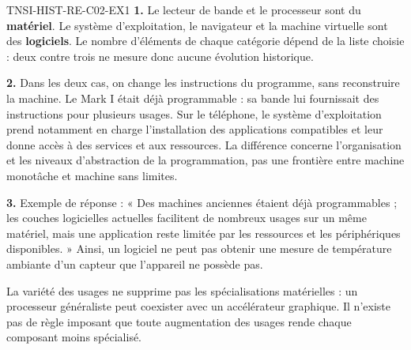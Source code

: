 \begin{corrige}{TNSI-HIST-RE-C02-EX1}
\textbf{1.} Le lecteur de bande et le processeur sont du \textbf{matériel}. Le système d'exploitation, le navigateur et la machine virtuelle sont des \textbf{logiciels}. Le nombre d'éléments de chaque catégorie dépend de la liste choisie : deux contre trois ne mesure donc aucune évolution historique.

\textbf{2.} Dans les deux cas, on change les instructions du programme, sans reconstruire la machine. Le Mark I était déjà programmable : sa bande lui fournissait des instructions pour plusieurs usages. Sur le téléphone, le système d'exploitation prend notamment en charge l'installation des applications compatibles et leur donne accès à des services et aux ressources. La différence concerne l'organisation et les niveaux d'abstraction de la programmation, pas une frontière entre machine monotâche et machine sans limites.

\textbf{3.} Exemple de réponse : « Des machines anciennes étaient déjà programmables ; les couches logicielles actuelles facilitent de nombreux usages sur un même matériel, mais une application reste limitée par les ressources et les périphériques disponibles. » Ainsi, un logiciel ne peut pas obtenir une mesure de température ambiante d'un capteur que l'appareil ne possède pas.

La variété des usages ne supprime pas les spécialisations matérielles : un processeur généraliste peut coexister avec un accélérateur graphique. Il n'existe pas de règle imposant que toute augmentation des usages rende chaque composant moins spécialisé.
\end{corrige}
